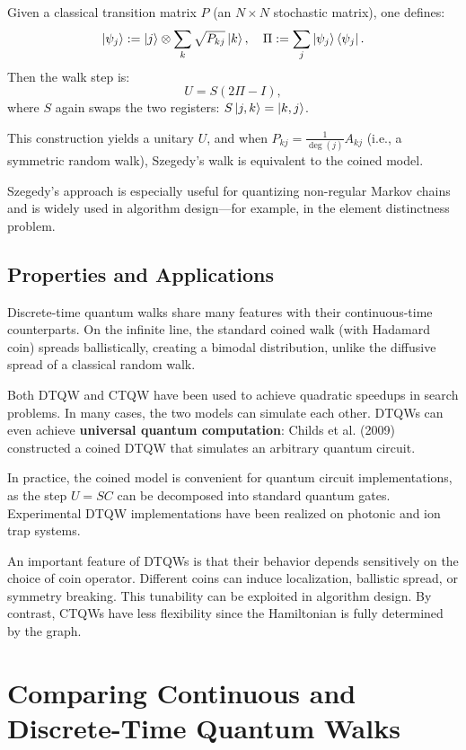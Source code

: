 \documentclass[12pt]{report}
\begin{document}
Given a classical transition matrix $P$ (an $N \times N$ stochastic matrix), one defines:
\[
\ket{\psi_j} := \ket{j} \otimes \sum_k \sqrt{P_{kj}} \ket{k},
\quad
\Pi := \sum_j \ket{\psi_j}\bra{\psi_j}.
\]
Then the walk step is:
\[
U = S (2\Pi - I),
\]
where $S$ again swaps the two registers: $S\ket{j,k} = \ket{k,j}$.

This construction yields a unitary $U$, and when $P_{kj} = \frac{1}{\deg(j)} A_{kj}$ (i.e., a symmetric random walk), Szegedy’s walk is equivalent to the coined model.

Szegedy’s approach is especially useful for quantizing non-regular Markov chains and is widely used in algorithm design—for example, in the element distinctness problem.

\subsection{Properties and Applications}

Discrete-time quantum walks share many features with their continuous-time counterparts. On the infinite line, the standard coined walk (with Hadamard coin) spreads ballistically, creating a bimodal distribution, unlike the diffusive spread of a classical random walk.

Both DTQW and CTQW have been used to achieve quadratic speedups in search problems. In many cases, the two models can simulate each other. DTQWs can even achieve \textbf{universal quantum computation}: Childs et al. (2009) constructed a coined DTQW that simulates an arbitrary quantum circuit.

In practice, the coined model is convenient for quantum circuit implementations, as the step $U = SC$ can be decomposed into standard quantum gates. Experimental DTQW implementations have been realized on photonic and ion trap systems.

An important feature of DTQWs is that their behavior depends sensitively on the choice of coin operator. Different coins can induce localization, ballistic spread, or symmetry breaking. This tunability can be exploited in algorithm design. By contrast, CTQWs have less flexibility since the Hamiltonian is fully determined by the graph.






\section{Comparing Continuous and Discrete-Time Quantum Walks}
\end{document}
